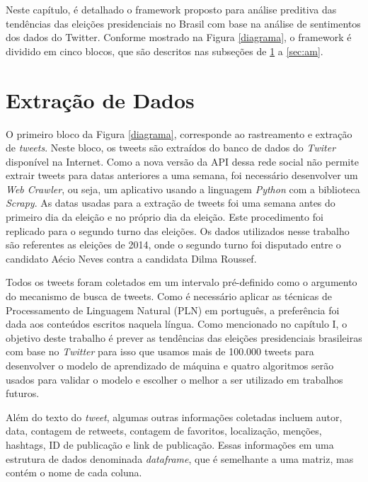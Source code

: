 Neste capítulo, é detalhado o framework proposto para análise
preditiva das tendências das eleições presidenciais no Brasil
com base na análise de sentimentos dos dados do Twitter.
Conforme mostrado na Figura \ref{diagrama}, o framework é dividido em
cinco blocos, que são descritos nas subseções de \ref{extract} a \ref{sec:am}.


%


\section{Extração de Dados}
\label{extract}

O primeiro bloco da Figura \ref{diagrama}, corresponde ao rastreamento
e extração de \textit{tweets}. Neste bloco, os tweets são extraídos do
banco de dados do \textit{Twiter} disponível na Internet. Como a nova
versão da \acrshort{API} dessa rede social não permite extrair tweets para datas
anteriores a uma semana, foi necessário desenvolver um \textit{Web
Crawler}, ou seja, um aplicativo usando a linguagem \textit{Python}
com a biblioteca \textit{Scrapy}. As datas usadas para a extração de
tweets foi uma semana antes do primeiro dia da eleição e no
próprio dia da eleição. Este procedimento foi replicado para
o segundo turno das eleições. Os dados utilizados nesse trabalho são referentes as eleições de 2014, onde o segundo turno
foi disputado entre o candidato Aécio Neves contra a candidata Dilma Roussef.


Todos os tweets foram coletados em um intervalo pré-definido
como o argumento do mecanismo de busca de tweets.
Como é necessário aplicar as técnicas de Processamento de
Linguagem Natural (PLN) em português, a preferência foi
dada aos conteúdos escritos naquela língua. Como mencionado
no capítulo I, o objetivo deste trabalho é prever as tendências
das eleições presidenciais brasileiras com base no \textit{Twitter} para
isso que usamos mais de 100.000 tweets para desenvolver o
modelo de aprendizado de máquina e quatro algoritmos serão
usados para validar o modelo e escolher o melhor a ser utilizado em trabalhos futuros.

Além do texto do \textit{tweet}, algumas outras informações coletadas
incluem autor, data, contagem de retweets, contagem de
favoritos, localização, menções, hashtags, ID de publicação e
link de publicação. Essas informações em uma estrutura de dados denominada \textit{dataframe}, que é semelhante a uma matriz, mas contém o nome de cada 
coluna.


